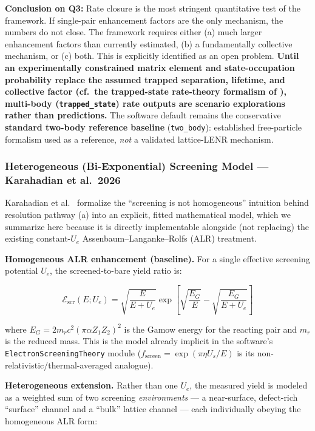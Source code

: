 \documentclass[11pt,a4paper]{article}
\begin{document}
\textbf{Conclusion on Q3:} Rate closure is the most stringent quantitative test of the framework. If single-pair enhancement factors are the only mechanism, the numbers do not close. The framework requires either (a) much larger enhancement factors than currently estimated, (b) a fundamentally collective mechanism, or (c) both. This is explicitly identified as an open problem. \textbf{Until an experimentally constrained matrix element and state-occupation probability replace the assumed trapped separation, lifetime, and collective factor (cf.~the trapped-state rate-theory formalism of \citep{takahashi2016}), multi-body (\texttt{trapped\_state}) rate outputs are scenario explorations rather than predictions.} The software default remains the conservative \textbf{standard two-body reference baseline} (\texttt{two\_body}): established free-particle formalism used as a reference, \emph{not} a validated lattice-LENR mechanism.

\subsubsection{Heterogeneous (Bi-Exponential) Screening Model --- Karahadian et al.~2026}

Karahadian et al.~\citep{karahadian2026} formalize the ``screening is not homogeneous'' intuition behind resolution pathway (a) into an explicit, fitted mathematical model, which we summarize here because it is directly implementable alongside (not replacing) the existing constant-$U_e$ Assenbaum--Langanke--Rolfs (ALR) treatment.

\textbf{Homogeneous ALR enhancement (baseline).} For a single effective screening potential $U_e$, the screened-to-bare yield ratio is:

\begin{equation}
\mathcal{E}_{\text{scr}}(E; U_e) = \sqrt{\frac{E}{E + U_e}} \exp\left[\sqrt{\frac{E_G}{E}} - \sqrt{\frac{E_G}{E + U_e}}\right]
\end{equation}

where $E_G = 2 m_r c^2 (\pi \alpha Z_1 Z_2)^2$ is the Gamow energy for the reacting pair and $m_r$ is the reduced mass. This is the model already implicit in the software's \texttt{ElectronScreeningTheory} module ($f_{\text{screen}} = \exp(\pi \eta U_s/E)$ is its non-relativistic/thermal-averaged analogue).

\textbf{Heterogeneous extension.} Rather than one $U_e$, the measured yield is modeled as a weighted sum of two screening \emph{environments} --- a near-surface, defect-rich ``surface'' channel and a ``bulk'' lattice channel --- each individually obeying the homogeneous ALR form:
\end{document}
